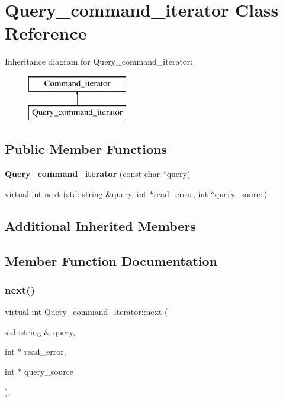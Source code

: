 \hypertarget{classQuery__command__iterator}{}\section{Query\+\_\+command\+\_\+iterator Class Reference}
\label{classQuery__command__iterator}
Inheritance diagram for Query\+\_\+command\+\_\+iterator\+:\begin{figure}[H]
\begin{center}
\leavevmode
\includegraphics[height=2.000000cm]{classQuery__command__iterator}
\end{center}
\end{figure}
\subsection*{Public Member Functions}
\begin{DoxyCompactItemize}
\item 
\mbox{\label{classQuery__command__iterator_a8f38698463f5341ed07a2caeb19c793e}} 
{\bfseries Query\+\_\+command\+\_\+iterator} (const char $\ast$query)
\item 
virtual int \mbox{\hyperlink{classQuery__command__iterator_af435eec8fe683776fb10e5012b1987a3}{next}} (std\+::string \&query, int $\ast$read\+\_\+error, int $\ast$query\+\_\+source)
\end{DoxyCompactItemize}
\subsection*{Additional Inherited Members}


\subsection{Member Function Documentation}
\mbox{\label{classQuery__command__iterator_af435eec8fe683776fb10e5012b1987a3}} 
\subsubsection{\texorpdfstring{next()}{next()}}
{\footnotesize\ttfamily virtual int Query\+\_\+command\+\_\+iterator\+::next (\begin{DoxyParamCaption}\item[{std\+::string \&}]{query,  }\item[{int $\ast$}]{read\+\_\+error,  }\item[{int $\ast$}]{query\+\_\+source }\end{DoxyParamCaption})\hspace{0.3cm}{\ttfamily [inline]}, {\ttfamily [virtual]}}

